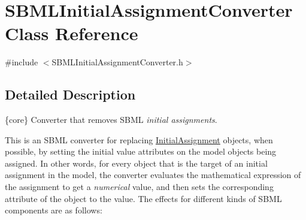 \hypertarget{class_s_b_m_l_initial_assignment_converter}{}\section{S\+B\+M\+L\+Initial\+Assignment\+Converter Class Reference}
\label{class_s_b_m_l_initial_assignment_converter}


{\ttfamily \#include $<$S\+B\+M\+L\+Initial\+Assignment\+Converter.\+h$>$}



\subsection{Detailed Description}
\{core\} Converter that removes S\+B\+ML {\itshape initial assignments}.



This is an S\+B\+ML converter for replacing \hyperlink{class_initial_assignment}{Initial\+Assignment} objects, when possible, by setting the initial value attributes on the model objects being assigned. In other words, for every object that is the target of an initial assignment in the model, the converter evaluates the mathematical expression of the assignment to get a {\itshape numerical} value, and then sets the corresponding attribute of the object to the value. The effects for different kinds of S\+B\+ML components are as follows\+:

